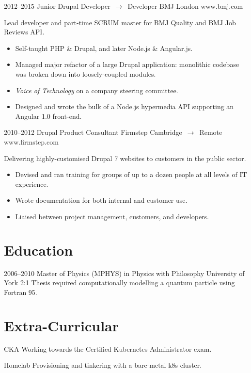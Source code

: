 \documentclass[11pt, a4paper, sans]{moderncv}
\begin{document}
\vspace*{3mm}

\cventry
  {2012--2015}
  {Junior Drupal Developer $\,\to\,$ Developer}
  {BMJ}
  {London}
  {www.bmj.com}
  {
    Lead developer and part-time SCRUM master for BMJ Quality and BMJ Job Reviews API.
    \begin{itemize}
      \item Self-taught PHP \& Drupal, and later Node.js \& Angular.js.
      \item Managed major refactor of a large Drupal application: monolithic codebase was broken down into loosely-coupled modules.
      \item \emph{Voice of Technology} on a company steering committee.
      \item Designed and wrote the bulk of a Node.js hypermedia API supporting an Angular 1.0 front-end.
    \end{itemize}
  }

\vspace*{3mm}

\cventry
  {2010--2012}
  {Drupal Product Consultant}
  {Firmstep}
  {Cambridge $\,\to\,$ Remote}
  {www.firmstep.com}
  {
    Delivering highly-customised Drupal 7 websites to customers in the public sector.
    \begin{itemize}
      \item Devised and ran training for groups of up to a dozen people at all levels of IT experience.
      \item Wrote documentation for both internal and customer use.
      \item Liaised between project management, customers, and developers.
    \end{itemize}
  }

\section{Education}

\cventry
  {2006--2010}
  {Master of Physics (\small{MPHYS}) in Physics with Philosophy}
  {University of York}
  {}
  {2:1}
  {
    Thesis required computationally modelling a quantum particle using Fortran 95.
  }

\section{Extra-Curricular}

\cvitem
  {CKA}
  {
		Working towards the Certified Kubernetes Administrator exam.
  }

\vspace*{3mm}

\cvitem
	{Homelab}
  {
		Provisioning and tinkering with a bare-metal k8s cluster.
  }
\end{document}
